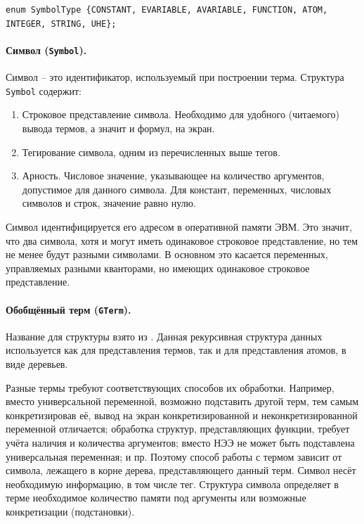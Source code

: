 {\tt enum SymbolType \{CONSTANT, EVARIABLE, AVARIABLE, FUNCTION, ATOM, INTEGER, STRING, UHE\};}

\paragraph{Символ (\texttt{Symbol}).}
Символ -- это идентификатор, используемый при построении терма. Структура \texttt{Symbol} содержит:
\begin{enumerate}
\item Строковое представление символа. Необходимо для удобного (читаемого) вывода термов, а значит и формул, на экран.
\item Тегирование символа, одним из перечисленных выше тегов.
\item Арность. Числовое значение, указывающее на количество аргументов, допустимое для данного символа. Для констант, переменных, числовых символов и строк, значение равно нулю.
\end{enumerate}

Символ идентифицируется его адресом в оперативной памяти ЭВМ. Это значит, что два символа, хотя и могут иметь одинаковое строковое представление, но тем не менее будут разными символами. В основном это касается переменных, управляемых разными кванторами, но имеющих одинаковое строковое представление.

\paragraph{Обобщённый терм (\texttt{GTerm}).}
Название для структуры взято из \cite{NNN}. Данная рекурсивная структура данных используется как для представления термов, так и для представления атомов, в виде деревьев.

Разные термы требуют соответствующих способов их обработки. Например, вместо универсальной переменной, возможно подставить другой терм, тем самым конкретизировав её, вывод на экран конкретизированной и неконкретизированной переменной отличается; обработка  структур, представляющих функции, требует учёта наличия и количества аргументов; вместо НЭЭ не может быть подставлена универсальная переменная; и пр. Поэтому способ работы с термом зависит от символа, лежащего в корне дерева, представляющего данный терм. Символ несёт необходимую информацию, в том числе тег. Структура символа определяет в терме необходимое количество памяти под аргументы или возможные конкретизации (подстановки).

